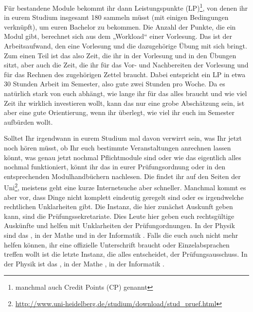 Für bestandene Module bekommt ihr dann Leistungspunkte
(\gls{LP})\footnote{manchmal auch Credit Points (\gls{CP}) genannt}, von denen
ihr in eurem Studium insgesamt 180 sammeln müsst (mit einigen Bedingungen
verknüpft), um euren Bachelor zu bekommen. Die Anzahl der Punkte, die ein Modul
gibt, berechnet sich aus dem „Workload“ einer Vorlesung. Das ist der
Arbeitsaufwand, den eine Vorlesung und die dazugehörige Übung mit sich bringt.
Zum einen Teil ist das also Zeit, die ihr in der Vorlesung und in den Übungen
sitzt, aber auch die Zeit, die ihr für das Vor- und Nachbereiten der Vorlesung
und für das Rechnen des zugehörigen Zettel braucht. Dabei entspricht ein
\gls{LP} in etwa 30 Stunden Arbeit im Semester, also gute zwei Stunden pro
Woche. Da es natürlich stark von euch abhängt, wie lange ihr für das alles
braucht und wie viel Zeit ihr wirklich investieren wollt, kann das nur eine
grobe Abschätzung sein, ist aber eine gute Orientierung, wenn ihr überlegt, wie
viel ihr euch im Semester aufbürden wollt.

Solltet Ihr irgendwann in eurem Studium mal davon verwirrt sein, was Ihr jetzt
noch hören müsst, ob Ihr euch bestimmte Veranstaltungen anrechnen lassen könnt,
was genau jetzt nochmal Pflichtmodule sind oder wie das eigentlich alles
nochmal funktioniert, könnt ihr das in eurer Prüfungsordnung oder in den
entsprechenden Modulhandbüchern nachlesen. Die findet ihr auf den Seiten der
Uni\footnote{\url{http://www.uni-heidelberg.de/studium/download/stud_pruef.html}},
meistens geht eine kurze Internetsuche aber schneller. Manchmal kommt es aber
vor, dass Dinge nicht komplett eindeutig geregelt sind oder es irgendwelche
rechtlichen Unklarheiten gibt. Die Instanz, die hier zunächst Auskunft geben
kann, sind die Prüfungssekretariate. Dies Leute hier geben euch rechtsgültige
Auskünfte und helfen mit Unklarheiten der Prüfungordnungen. In der Physik sind
das \pruefsekphysik, in der Mathe \pruefsekmathe und in der
Informatik \pruefsekinfo. Falls die euch auch nicht mehr helfen können, ihr
eine offizielle Unterschrift braucht oder Einzelabsprachen treffen wollt ist
die letzte Instanz, die alles entscheidet, der Prüfungsausschuss. In der Physik
ist das \pruefausschussvorsitzphysik, in der Mathe \pruefausschussvorsitzmathe,
in der Informatik \pruefausschussvorsitzinformatik.
